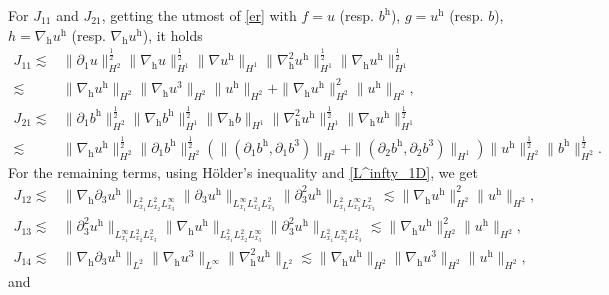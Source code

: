 \documentclass[11pt]{amsart}
\theoremstyle{definition}
\newcommand{\h}{\mathrm{h}}
\newcommand{\nablah}{\nabla_{\mathrm{h}}}
\numberwithin{equation}{section}
\begin{document}
For $J_{11}$ and $J_{21}$,
getting the utmost of \eqref{er} with $f=u$ (resp. $b^\h$), $g= u^\mathrm{h}$ (resp. $b$), $h=\nabla_\mathrm{h} u^\mathrm{h}$ (resp. $\nablah u^\h$), it holds
\begin{align*}
	J_{11}\lesssim& \|\partial_1u\|_{H^2}^\frac12\|\nabla_\h u\|_{H^1}^\frac12\|\nabla u^\h\|_{H^1}\|\nabla^2_\mathrm{h} u^\mathrm{h}\|_{H^1}^\frac12\|\nabla_\mathrm{h} u^\mathrm{h}\|_{H^1}^\frac12\\
	\lesssim&\|\nabla_\mathrm{h} u^\mathrm{h}\|_{H^2}\|\nabla_\mathrm{h} u^3\|_{H^2}\| u^\mathrm{h}\|_{H^2}+\|\nabla_\mathrm{h} u^\mathrm{h}\|_{H^2}^2\| u^\mathrm{h}\|_{H^2},\\
	J_{21}\lesssim &\|\partial_1b^\h\|_{H^2}^\frac12\|\nabla_\h b^\h\|_{H^1}^\frac12\|\nablah b\|_{H^1}\|\nabla^2_\mathrm{h} u^\mathrm{h}\|_{H^1}^\frac12\|\nabla_\mathrm{h} u^\mathrm{h}\|_{H^1}^\frac12\\
	\lesssim&\|\nabla_\mathrm{h} u^\mathrm{h}\|_{H^2}^\frac12\|\partial_1b^\h\|_{H^2}^\frac12\left(\|(\partial_1 b^\h,\partial_1b^3)\|_{H^2}+\|(\partial_2 b^\h,\partial_2b^3)\|_{H^1}\right)\|u^\mathrm{h}\|_{H^2}^\frac12\| b^\h\|_{H^2}^\frac12.
\end{align*}
For the remaining terms, using H\"older's inequality and \eqref{L^infty_1D}, we get
\begin{align*}
	J_{12}\lesssim &\|\nablah\partial_3u^\h\|_{L^2_{x_1}L^2_{x_2}L^\infty_{x_3}}\|\partial_3 u^\h  \|_{L^\infty_{x_1}L^2_{x_2}L^2_{x_3}}\|\partial_3^2 u^\h \|_{L^2_{x_1}L^\infty_{x_2}L^2_{x_3}}
	\lesssim\|\nabla_\mathrm{h} u^\mathrm{h}\|_{H^2}^2\| u^\mathrm{h}\|_{H^2} ,\\
	J_{13}\lesssim &\|\partial_3^2u^\h\|_{L^\infty_{x_1}L^2_{x_2}L^2_{x_3}}\|\nablah u^\h\|_{L^2_{x_1}L^2_{x_2}L^\infty_{x_3}}\|\partial_3^2 u^\h \|_{L^2_{x_1}L^\infty_{x_2}L^2_{x_3}}
	\lesssim\|\nabla_\mathrm{h} u^\mathrm{h}\|_{H^2}^2\| u^\mathrm{h}\|_{H^2},\\
	J_{14}\lesssim&\|\nablah\partial_3 u^\h \|_{L^2}\|\nablah u^3\|_{L^\infty}\|\nablah^2 u ^\h\|_{L^2}\lesssim\|\nabla_\mathrm{h} u^\mathrm{h}\|_{H^2}\|\nabla_\mathrm{h} u^3\|_{H^2}\| u^\mathrm{h}\|_{H^2},
\end{align*}
and
\end{document}
